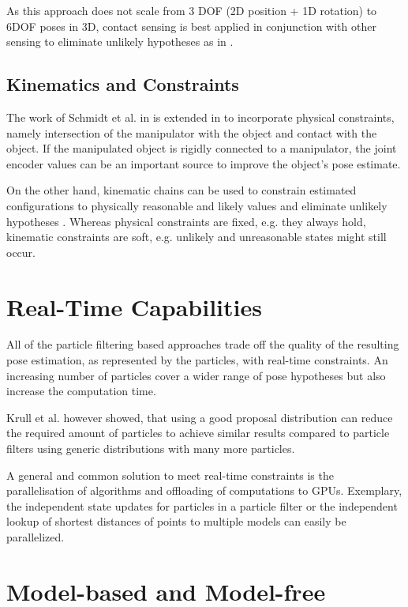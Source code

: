 As this approach does not scale from 3 DOF (2D position + 1D rotation) to 6DOF poses in 3D, contact sensing is best applied in conjunction with other sensing to eliminate unlikely hypotheses as in \cite{Schmidt2015b}.

\subsection{Kinematics and Constraints}

The work of Schmidt et al. in \cite{Schmidt2015} is extended in \cite{Schmidt2015b} to incorporate physical constraints, namely intersection of the manipulator with the object and contact with the object.
If the manipulated object is rigidly connected to a manipulator, the joint encoder values can be an important source to improve the object's pose estimate.

On the other hand, kinematic chains can be used to constrain estimated configurations to physically reasonable and likely values and eliminate unlikely hypotheses \cite{Shotton2013, Sharp2015}.
Whereas physical constraints are fixed, e.g. they always hold, kinematic constraints are soft, e.g. unlikely and unreasonable states might still occur.

\section{Real-Time Capabilities}

All of the particle filtering based approaches trade off the quality of the resulting pose estimation, as represented by the particles, with real-time constraints. An increasing number of particles cover a wider range of pose hypotheses but also increase the computation time.

Krull et al. \cite{Krull2015} however showed, that using a good proposal distribution can reduce the required amount of particles to achieve similar results compared to particle filters using generic distributions with many more particles.

A general and common solution to meet real-time constraints is the parallelisation of algorithms and offloading of computations to GPUs. Exemplary, the independent state updates for particles in a particle filter \cite{Choi2013} or the independent lookup of shortest distances of points to multiple models \cite{Schmidt2015} can easily be parallelized.


\section{Model-based and Model-free}

